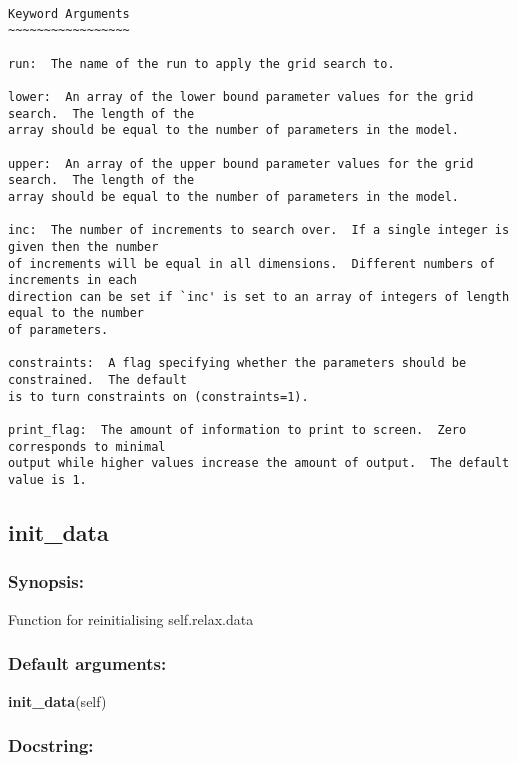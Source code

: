 {\scriptsize
\begin{verbatim}

Keyword Arguments
~~~~~~~~~~~~~~~~~

run:  The name of the run to apply the grid search to.

lower:  An array of the lower bound parameter values for the grid search.  The length of the
array should be equal to the number of parameters in the model.

upper:  An array of the upper bound parameter values for the grid search.  The length of the
array should be equal to the number of parameters in the model.

inc:  The number of increments to search over.  If a single integer is given then the number
of increments will be equal in all dimensions.  Different numbers of increments in each
direction can be set if `inc' is set to an array of integers of length equal to the number
of parameters.

constraints:  A flag specifying whether the parameters should be constrained.  The default
is to turn constraints on (constraints=1).

print_flag:  The amount of information to print to screen.  Zero corresponds to minimal
output while higher values increase the amount of output.  The default value is 1.
\end{verbatim}
}



\newpage

\subsection{init\_data}


\subsubsection{Synopsis:}

Function for reinitialising self.relax.data

\subsubsection{Default arguments:}

\textsf{\textbf{init\_data}(self)
}


\subsubsection{Docstring:}


